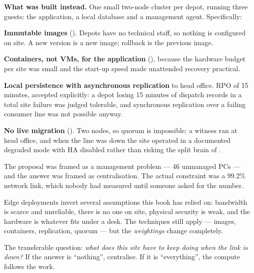 \textbf{What was built instead.} One small two-node cluster per depot, running
three guests: the application, a local database and a management agent.
Specifically:

\begin{tight}
  \item \textbf{Immutable images} (). Depots have no
        technical staff, so nothing is configured on site. A new version is a
        new image; rollback is the previous image.
  \item \textbf{Containers, not VMs, for the application} (),
        because the hardware budget per site was small and the start-up speed
        made unattended recovery practical.
  \item \textbf{Local persistence with asynchronous replication} to head
        office. RPO of 15 minutes, accepted explicitly: a depot losing 15
        minutes of dispatch records in a total site failure was judged
        tolerable, and synchronous replication over a failing consumer line was
        not possible anyway.
  \item \textbf{No live migration} (). Two nodes, so quorum is
        impossible; a witness ran at head office, and when the line was down
        the site operated in a documented degraded mode with HA disabled
        rather than risking the split brain of .
\end{tight}

\begin{conceptbox}
The proposal was framed as a management problem --- 46 unmanaged PCs --- and
the answer was framed as centralisation. The actual constraint was a 99.2\%
network link, which nobody had measured until someone asked for the number.

\smallskip
Edge deployments invert several assumptions this book has relied on: bandwidth
is scarce and unreliable, there is no one on site, physical security is weak,
and the hardware is whatever fits under a desk. The techniques still apply ---
images, containers, replication, quorum --- but the \emph{weightings} change
completely.

\smallskip
The transferable question: \emph{what does this site have to keep doing when
the link is down?} If the answer is ``nothing'', centralise. If it is
``everything'', the compute follows the work.
\end{conceptbox}

